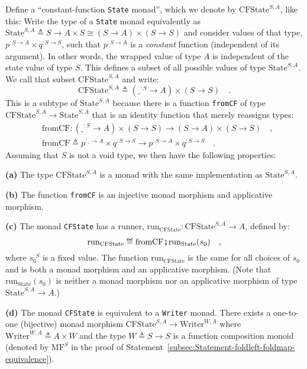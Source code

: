 Define a \textsf{``}constant-function \lstinline!State! monad\textsf{''}, which we
denote by $\text{CFState}^{S,A}$, like this: Write the type of a
\lstinline!State! monad equivalently as $\text{State}^{S,A}\triangleq S\rightarrow A\times S\cong(S\rightarrow A)\times(S\rightarrow S)$
and consider values of that type, $p^{:S\rightarrow A}\times q^{:S\rightarrow S}$,
such that $p^{:S\rightarrow A}$ is a\emph{ constant} function (independent
of its argument). In other words, the wrapped value of type $A$ is
independent of the state value of type $S$. This defines a subset
of all possible values of type $\text{State}^{S,A}$. We call that
subset $\text{CFState}^{S,A}$ and write: 
\[
\text{CFState}^{S,A}\triangleq(\_^{:S}\rightarrow A)\times(S\rightarrow S)\quad.
\]
This is a subtype of $\text{State}^{S,A}$ because there is a function
\lstinline!fromCF! of type $\text{CFState}^{S,A}\rightarrow\text{State}^{S,A}$
that is an identity function that merely reassigns types:
\begin{align*}
 & \text{fromCF}:(\_^{:S}\rightarrow A)\times(S\rightarrow S)\rightarrow(S\rightarrow A)\times(S\rightarrow S)\quad,\\
 & \text{fromCF}\triangleq p^{:\_\rightarrow A}\times q^{:S\rightarrow S}\rightarrow p^{:S\rightarrow A}\times q^{:S\rightarrow S}\quad.
\end{align*}
Assuming that $S$ is not a void type, we then have the following
properties:

\textbf{(a)} The type $\text{CFState}^{S,A}$ is a monad with the
same implementation as $\text{State}^{S,A}$.

\textbf{(b)} The function \lstinline!fromCF! is an injective monad
morphism and applicative morphism.

\textbf{(c)} The monad \lstinline!CFState! has a runner, $\text{run}_{\text{CFState}}:\text{CFState}^{S,A}\rightarrow A$,
defined by:
\[
\text{run}_{\text{CFState}}\triangleq\text{fromCF}\bef\text{run}_{\text{State}}(s_{0})\quad,
\]
where $s_{0}^{:S}$ is a fixed value. The function $\text{run}_{\text{CFState}}$
is the same for all choices of $s_{0}$ and is both a monad morphism
and an applicative morphism. (Note that $\text{run}_{\text{State}}(s_{0})$
is neither a monad morphism nor an applicative morphism of type $\text{State}^{S,A}\rightarrow A$.) 

\textbf{(d)} The monad \lstinline!CFState! is equivalent to a \lstinline!Writer!
monad. There exists a one-to-one (bijective) monad morphism $\text{CFState}^{S,A}\rightarrow\text{Writer}^{W,A}$
where $\text{Writer}^{W,A}\triangleq A\times W$ and the type $W\triangleq S\rightarrow S$
is a function composition monoid (denoted by $\text{MF}^{S}$ in the
proof of Statement~\ref{subsec:Statement-foldleft-foldmap-equivalence}).

